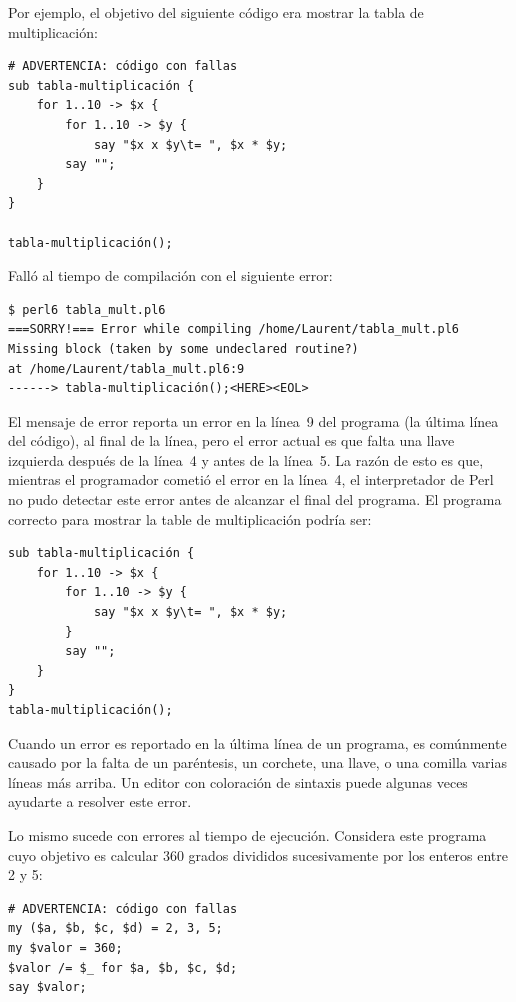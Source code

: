 Por ejemplo, el objetivo del siguiente código era mostrar
la tabla de multiplicación:

\begin{verbatim}
# ADVERTENCIA: código con fallas
sub tabla-multiplicación {
    for 1..10 -> $x {
        for 1..10 -> $y {
            say "$x x $y\t= ", $x * $y;
        say "";
    }
}

tabla-multiplicación();
\end{verbatim}

Falló al tiempo de compilación con el siguiente error:

\begin{verbatim}
$ perl6 tabla_mult.pl6
===SORRY!=== Error while compiling /home/Laurent/tabla_mult.pl6
Missing block (taken by some undeclared routine?)
at /home/Laurent/tabla_mult.pl6:9
------> tabla-multiplicación();<HERE><EOL>
\end{verbatim}

El mensaje de error reporta un error en la línea~9 del 
programa (la última línea del código), al final de la línea,
pero el error actual es que falta una llave izquierda después
de la línea~4 y antes de la línea~5. La razón de esto es que,
mientras el programador cometió el error en la línea~4,
el interpretador de Perl no pudo detectar este error antes 
de alcanzar el final del programa. El programa correcto para mostrar
la table de multiplicación podría ser:

\begin{verbatim}
sub tabla-multiplicación {
    for 1..10 -> $x {
        for 1..10 -> $y {
            say "$x x $y\t= ", $x * $y;
        }
        say "";
    }
}
tabla-multiplicación();
\end{verbatim}

Cuando un error es reportado en la última línea de un
programa, es comúnmente causado por la falta de un
paréntesis, un corchete, una llave, o una comilla varias
líneas más arriba. Un editor con coloración de sintaxis
puede algunas veces ayudarte a resolver este error.


Lo mismo sucede con errores al tiempo de ejecución. Considera
este programa cuyo objetivo es calcular 360 grados divididos
sucesivamente por los enteros entre 2 y 5:

\begin{verbatim}
# ADVERTENCIA: código con fallas
my ($a, $b, $c, $d) = 2, 3, 5;
my $valor = 360;
$valor /= $_ for $a, $b, $c, $d;
say $valor;
\end{verbatim}

